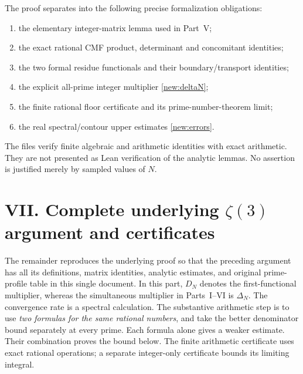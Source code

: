 \documentclass[11pt]{article}
\begin{document}
The proof separates into the following precise formalization obligations:
\begin{enumerate}
 \item the elementary integer-matrix lemma used in Part~V;
 \item the exact rational CMF product, determinant and concomitant identities;
 \item the two formal residue functionals and their boundary/transport identities;
 \item the explicit all-prime integer multiplier \eqref{new:deltaN};
 \item the finite rational floor certificate and its prime-number-theorem limit;
 \item the real spectral/contour upper estimates \eqref{new:errors}.
\end{enumerate}
The files verify finite algebraic and arithmetic identities with exact
arithmetic. They are not presented as Lean verification of the analytic
lemmas. No assertion is justified merely by sampled values of $N$.

\clearpage
\section*{VII. Complete underlying $\zeta(3)$ argument and certificates}
The remainder reproduces the underlying proof so that the preceding argument
has all its definitions, matrix identities, analytic estimates, and original
prime-profile table in this single document. In this part, $D_N$ denotes the
first-functional multiplier, whereas the simultaneous multiplier in
Parts~I--VI is $\Delta_N$.
\bigskip
\noindent The convergence rate is a spectral calculation. The substantive
arithmetic step is to use \emph{two formulas for the same rational numbers},
and take the better denominator bound separately at every prime. Each formula
alone gives a weaker estimate. Their combination proves the bound below.
The finite arithmetic certificate uses exact rational operations; a separate
integer-only certificate bounds its limiting integral.
\end{document}
